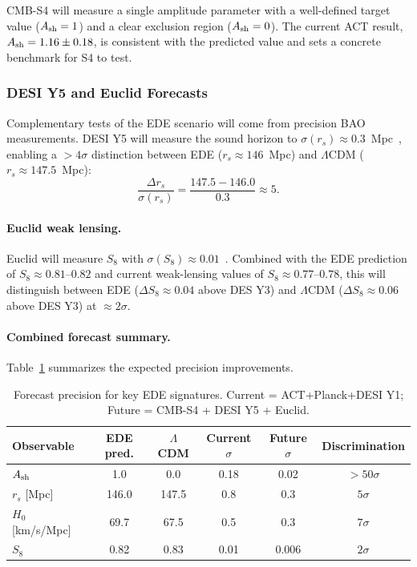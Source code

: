 \documentclass[a4paper,11pt]{article}
\begin{document}
CMB-S4 will measure a single amplitude parameter with a well-defined target value ($A_{\rm sh} = 1$) and a clear exclusion region ($A_{\rm sh} = 0$). The current ACT result, $A_{\rm sh} = 1.16 \pm 0.18$, is consistent with the predicted value and sets a concrete benchmark for S4 to test.

\subsubsection{DESI Y5 and Euclid Forecasts}

Complementary tests of the EDE scenario will come from precision BAO measurements. DESI Y5 will measure the sound horizon to $\sigma(r_s) \approx 0.3$~Mpc~\cite{DESI_forecast}, enabling a $>4\sigma$ distinction between EDE ($r_s \approx 146$~Mpc) and $\Lambda$CDM ($r_s \approx 147.5$~Mpc):
\begin{equation}
\frac{\Delta r_s}{\sigma(r_s)} = \frac{147.5 - 146.0}{0.3} \approx 5.
\end{equation}

\paragraph{Euclid weak lensing.}
Euclid will measure $S_8$ with $\sigma(S_8) \approx 0.01$~\cite{Euclid_forecast}. Combined with the EDE prediction of $S_8 \approx 0.81$--$0.82$ and current weak-lensing values of $S_8 \approx 0.77$--$0.78$, this will distinguish between EDE ($\Delta S_8 \approx 0.04$ above DES Y3) and $\Lambda$CDM ($\Delta S_8 \approx 0.06$ above DES Y3) at $\approx 2\sigma$.

\paragraph{Combined forecast summary.}
Table~\ref{tab:forecasts} summarizes the expected precision improvements.

\begin{table}[h]
\centering
\caption{Forecast precision for key EDE signatures. Current = ACT+Planck+DESI Y1; Future = CMB-S4 + DESI Y5 + Euclid.}
\label{tab:forecasts}
\begin{tabular}{lccccc}
\toprule
\textbf{Observable} & \textbf{EDE pred.} & \textbf{$\Lambda$CDM} & \textbf{Current $\sigma$} & \textbf{Future $\sigma$} & \textbf{Discrimination} \\
\midrule
$A_{\rm sh}$ & 1.0 & 0.0 & 0.18 & 0.02 & $>50\sigma$ \\
$r_s$ [Mpc] & 146.0 & 147.5 & 0.8 & 0.3 & $5\sigma$ \\
$H_0$ [km/s/Mpc] & 69.7 & 67.5 & 0.5 & 0.3 & $7\sigma$ \\
$S_8$ & 0.82 & 0.83 & 0.01 & 0.006 & $2\sigma$ \\
\bottomrule
\end{tabular}
\end{table}
\end{document}
